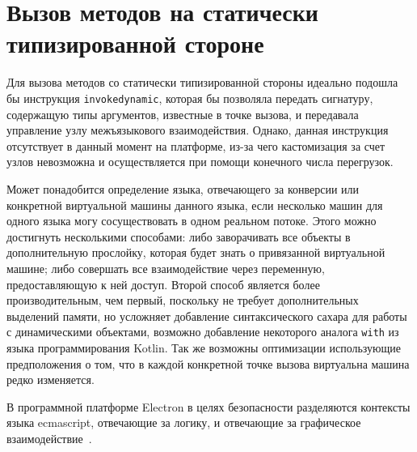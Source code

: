 \documentclass[times
,titlepage
]{itmo-student-thesis}
\begin{document}
\section{Вызов методов на статически типизированной стороне}
Для вызова методов со статически типизированной стороны идеально подошла бы инструкция \texttt{invokedynamic}, которая бы позволяла передать сигнатуру, содержащую типы аргументов, известные в точке вызова, и передавала управление узлу межъязыкового взаимодействия. Однако, данная инструкция отсутствует в данный момент на платформе, из-за чего кастомизация за счет узлов невозможна и осуществляется при помощи конечного числа перегрузок.

Может понадобится определение языка, отвечающего за конверсии или конкретной виртуальной машины данного языка, если несколько машин для одного языка могу сосуществовать в одном реальном потоке. Этого можно достигнуть несколькими способами: либо заворачивать все объекты в дополнительную прослойку, которая будет знать о привязанной виртуальной машине; либо совершать все взаимодействие через переменную, предоставляющую к ней доступ. Второй способ является более производительным, чем первый, поскольку не требует дополнительных выделений памяти, но усложняет добавление синтаксического сахара для работы с динамическими объектами, возможно добавление некоторого аналога \texttt{with} из языка программирования Kotlin. Так же возможны оптимизации использующие предположения о том, что в каждой конкретной точке вызова виртуальна машина редко изменяется.

В программной платформе Electron в целях безопасности разделяются контексты языка ecmascript, отвечающие за логику, и отвечающие за графическое взаимодействие~\cite{electron-isolates}.
\end{document}

